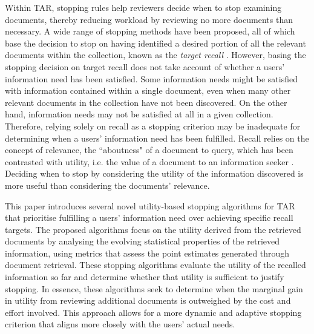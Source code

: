 \documentclass[sigconf,natbib=true,anonymous=true]{acmart}
\begin{document}
Within TAR, stopping rules help reviewers decide when to stop examining documents, thereby reducing workload by reviewing no more documents than necessary. A wide range of stopping methods have been proposed, all of which base the decision to stop on having identified a desired portion of all the relevant documents within the collection, known as the \emph{target recall} \cite{li2020stop,stevenson2023stopping}. However, basing the stopping decision on 
target recall does not take account of whether a users' information need has been satisfied. Some information needs might be satisfied with information contained within a single document, even when many other relevant documents in the collection have not been discovered. On the other hand, information needs may not be satisfied at all in a given collection. 
Therefore, relying solely on recall as a stopping criterion may be inadequate for determining when a users' information need has been fulfilled.
Recall relies on the concept of relevance, the ``aboutness" of a document to query, which has been contrasted with utility, i.e. the value of a document to an information seeker \cite{saracevic1988study,saracevic2022notion}. Deciding when to stop by considering the utility of the information discovered is more useful than considering the documents' relevance. 

This paper introduces several novel utility-based stopping algorithms for TAR that prioritise fulfilling a users' information need over achieving specific recall targets. 
The proposed algorithms focus on the utility derived from the retrieved documents by analysing the evolving statistical properties of the retrieved information, using metrics that assess the point estimates generated through document retrieval. These stopping algorithms evaluate the utility of the recalled information so far and determine whether that utility is sufficient to justify stopping. In essence, these algorithms seek to determine when the marginal gain in utility from reviewing additional documents is outweighed by the cost and effort involved. This approach allows for a more dynamic and adaptive stopping criterion that aligns more closely with the users' actual needs.
\end{document}
